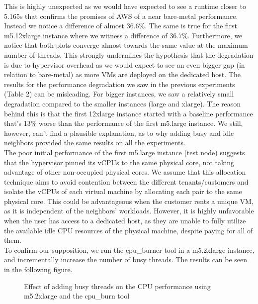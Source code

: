 This is highly unexpected as we would have expected to see a runtime closer to 5.165s that confirms 
the promises of AWS of a near bare-metal performance. Instead we notice a difference of almost 36.6\%. 
The same is true for the first m5.12xlarge instance where we witness a difference of 36.7\%. Furthermore, we notice that both plots converge almost towards the same value at 
the maximum number of threads. This strongly undermines the hypothesis that the degradation is due to 
hypervisor overhead as we would expect to see an even bigger gap (in relation to bare-metal) as 
more VMs are deployed on the dedicated host. The results for the performance degradation we saw in 
the previous experiments (Table 2) can be misleading. For bigger instances, we saw a relatively small 
degradation compared to the smaller instances (large and xlarge). The reason behind this is that the 
first 12xlarge instance started with a baseline performance that's 13\% worse than the performance 
of the first m5.large instance. We still, however, can't find a plausible explanation, as to why 
adding busy and idle neighbors provided the same results on all the experiments. \\
The poor initial performance of the first m5.large instance (test node) suggests that the hypervisor 
pinned its vCPUs to the same physical core, not taking advantage of other non-occupied physical cores. 
We assume that this allocation technique aims to avoid contention between the different tenants/customers 
and isolate the vCPUs of each virtual machine by allocating each pair to the same physical core. 
This could be advantageous when the customer rents a unique VM, as it is independent of the neighbors’ 
workloads. However, it is highly unfavorable when the user has access to a dedicated host, as they 
are unable to fully utilize the available idle CPU resources of the physical machine, despite paying 
for all of them. \\
To confirm our supposition, we run the cpu\_burner tool in a m5.2xlarge instance, and incrementally 
increase the number of busy threads. The results can be seen in the following figure. 
\begin{figure}[H]
\centering
{}
\caption{Effect of adding busy threads on the CPU performance using m5.2xlarge and the cpu\_burn tool} 
\end{figure}
